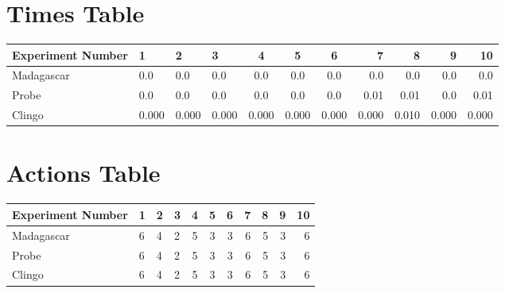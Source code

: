 \documentclass[8pt]{article}
\begin{document}
\begin{landscape}
\section{Times Table}\begin{tabular}{ | l | l | l | l | c | c | c | r | r | r | r | }\hline
Experiment Number & 1 & 2 & 3 & 4 & 5 & 6 & 7 & 8 & 9 & 10\\  \hline
Madagascar & 0.0 & 0.0 & 0.0 & 0.0 & 0.0 & 0.0 & 0.0 & 0.0 & 0.0 & 0.0\\  \hline
Probe & 0.0 & 0.0 & 0.0 & 0.0 & 0.0 & 0.0 & 0.01 & 0.01 & 0.0 & 0.01\\  \hline
Clingo & 0.000 & 0.000 & 0.000 & 0.000 & 0.000 & 0.000 & 0.000 & 0.010 & 0.000 & 0.000\\  \hline
\end{tabular}
\section{Actions Table}\begin{tabular}{ | l | l | l | l | c | c | c | r | r | r | r | }\hline
Experiment Number & 1 & 2 & 3 & 4 & 5 & 6 & 7 & 8 & 9 & 10\\ \hline
 Madagascar & 6 & 4 & 2 & 5 & 3 & 3 & 6 & 5 & 3 & 6\\ \hline
 Probe & 6 & 4 & 2 & 5 & 3 & 3 & 6 & 5 & 3 & 6\\ \hline
 Clingo & 6 & 4 & 2 & 5 & 3 & 3 & 6 & 5 & 3 & 6\\ \hline
\end{tabular}
\end{landscape}
\end{document}
